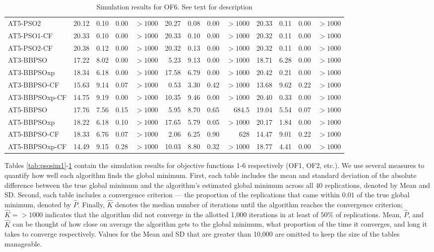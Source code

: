 \documentclass[cmbright]{staauth}
\begin{document}
\begin{table}[ht]
\begin{tabular}{l|rrrr|rrrr|rrrr}
  AT5-PSO2 & 20.12 & 0.10 & 0.00 & $> 1000$ & 20.27 & 0.08 & 0.00 & $> 1000$ & 20.33 & 0.11 & 0.00 & $> 1000$ \\
  AT5-PSO1-CF & 20.33 & 0.10 & 0.00 & $> 1000$ & 20.33 & 0.10 & 0.00 & $> 1000$ & 20.32 & 0.11 & 0.00 & $> 1000$ \\
  AT5-PSO2-CF & 20.38 & 0.12 & 0.00 & $> 1000$ & 20.32 & 0.13 & 0.00 & $> 1000$ & 20.32 & 0.11 & 0.00 & $> 1000$ \\
   \hline
AT3-BBPSO & 17.22 & 8.02 & 0.00 & $> 1000$ & 5.23 & 9.13 & 0.00 & $> 1000$ & 18.71 & 6.28 & 0.00 & $> 1000$ \\
  AT3-BBPSOxp & 18.34 & 6.18 & 0.00 & $> 1000$ & 17.58 & 6.79 & 0.00 & $> 1000$ & 20.42 & 0.21 & 0.00 & $> 1000$ \\
  AT3-BBPSO-CF & 15.63 & 9.14 & 0.07 & $> 1000$ & 0.53 & 3.30 & 0.42 & $> 1000$ & 13.68 & 9.62 & 0.22 & $> 1000$ \\
  AT3-BBPSOxp-CF & 14.75 & 9.19 & 0.00 & $> 1000$ & 10.35 & 9.46 & 0.00 & $> 1000$ & 20.40 & 0.33 & 0.00 & $> 1000$ \\
   \hline
AT5-BBPSO & 17.76 & 7.56 & 0.15 & $> 1000$ & 5.95 & 8.70 & 0.65 & 684.5 & 19.04 & 5.54 & 0.07 & $> 1000$ \\
  AT5-BBPSOxp & 18.22 & 6.18 & 0.10 & $> 1000$ & 17.65 & 5.79 & 0.05 & $> 1000$ & 20.17 & 1.84 & 0.00 & $> 1000$ \\
  AT5-BBPSO-CF & 18.33 & 6.76 & 0.07 & $> 1000$ & 2.06 & 6.25 & 0.90 & 628 & 14.47 & 9.01 & 0.22 & $> 1000$ \\
  AT5-BBPSOxp-CF & 14.49 & 9.15 & 0.28 & $> 1000$ & 10.03 & 8.80 & 0.32 & $> 1000$ & 18.77 & 4.41 & 0.00 & $> 1000$ \\
   \hline
\end{tabular}
\endgroup
\caption{Simulation results for OF6. See text for description}
\label{tab:psosim6}
\end{table}

Tables \ref{tab:psosim1}-\ref{tab:psosim6} contain the simulation results for objective functions 1-6 respectively (OF1, OF2, etc.). We use several measures to quantify how well each algorithm finds the global minimum. First, each table includes the mean and standard deviation of the absolute difference between the true global minimum and the algorithm's estimated global minimum across all 40 replications, denoted by Mean and SD. Second, each table includes a convergence criterion --- the proportion of the replications that came within $0.01$ of the true global minimum, denoted by $\widehat{P}$. Finally, $\widehat{K}$ denotes the median number of iterations until the algorithm reaches the convergence criterion; $\widehat{K}= > 1000$ indicates that the algorithm did not converge in the allotted 1,000 iterations in at least of $50\%$ of replications. Mean, $\widehat{P}$, and $\widehat{K}$ can be thought of how close on average the algorithm gets to the global minimum, what proportion of the time it converges, and long it takes to converge respectively. Values for the Mean and SD that are greater than 10,000 are omitted to keep the size of the tables manageable.
\end{document}

